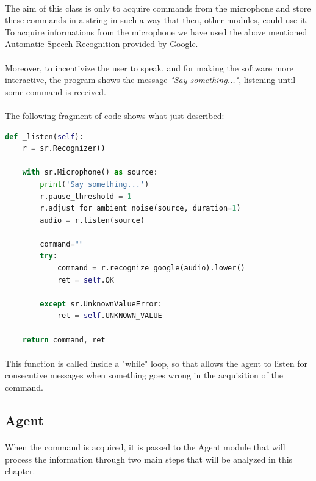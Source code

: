 \documentclass[12pt, a4paper]{article}
\begin{document}
\paragraph{}
The aim of this class is only to acquire commands from the microphone and store these commands in a string in such a way that then, other modules, could use it. To acquire informations from the microphone we have used the above mentioned Automatic Speech Recognition provided by Google. 
\paragraph{}
Moreover, to incentivize the user to speak, and for making the software more interactive, the program shows the message \textit{"Say something..."}, listening until some command is received.
\paragraph{}
The following fragment of code shows what just described:
\vspace{1em}
\begin{lstlisting}[language=Python, caption=The function that actually listens to the user and returns a string of text]
def _listen(self):
	r = sr.Recognizer()
	
	with sr.Microphone() as source:
		print('Say something...')
		r.pause_threshold = 1
		r.adjust_for_ambient_noise(source, duration=1)
		audio = r.listen(source)
		
		command=""
		try:
			command = r.recognize_google(audio).lower()
			ret = self.OK
		
		except sr.UnknownValueError:
			ret = self.UNKNOWN_VALUE
	
	return command, ret
\end{lstlisting}
\paragraph{}
This function is called inside a "while" loop, so that allows the agent to listen for consecutive messages when something goes wrong in the acquisition of the command.
\subsection{Agent}
\paragraph{}
When the command is acquired, it is passed to the Agent module that will process the information through two main steps that will be analyzed in this chapter.
\end{document}
